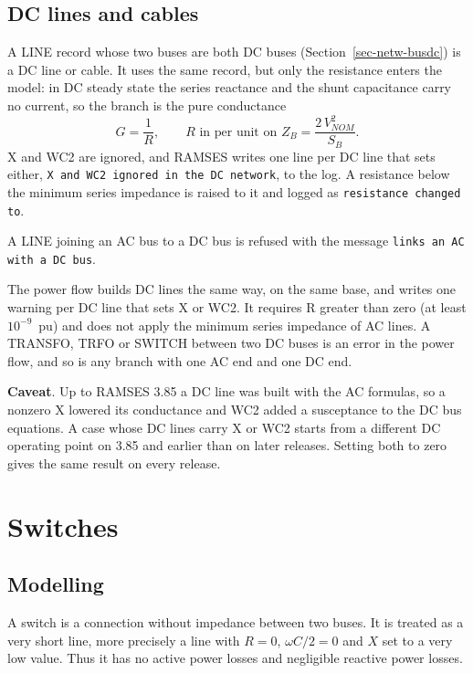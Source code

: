 \subsection{DC lines and cables}\label{sec-netw-dcline}

A LINE record whose two buses are both DC buses (Section~\ref{sec-netw-busdc}) is a DC line or cable. It uses the same record, but only the resistance enters the model: in DC steady state the series reactance and the shunt capacitance carry no current, so the branch is the pure conductance
\[
G = \frac{1}{R}, \qquad R \mbox{ in per unit on } Z_B = \frac{2\,V_{NOM}^2}{S_B}.
\]
X and WC2 are ignored, and RAMSES writes one line per DC line that sets either, {\tt X and WC2 ignored in the DC network}, to the log. A resistance below the minimum series impedance is raised to it and logged as {\tt resistance changed to}.

A LINE joining an AC bus to a DC bus is refused with the message {\tt links an AC with a DC bus}.

The power flow builds DC lines the same way, on the same base, and writes one warning per DC line that sets X or WC2. It requires R greater than zero (at least $10^{-9}$~pu) and does not apply the minimum series impedance of AC lines. A TRANSFO, TRFO or SWITCH between two DC buses is an error in the power flow, and so is any branch with one AC end and one DC end.

{\bf \large Caveat}. Up to RAMSES 3.85 a DC line was built with the AC formulas, so a nonzero X lowered its conductance and WC2 added a susceptance to the DC bus equations. A case whose DC lines carry X or WC2 starts from a different DC operating point on 3.85 and earlier than on later releases. Setting both to zero gives the same result on every release.

\section{Switches}\label{sec-netw-switch}

\subsection{Modelling}

A switch is a connection without impedance between two buses. It is treated as a very short line, more precisely a line with $R=0$, ${\omega}C/2 = 0$ and $X$ set to a very low value. Thus it has no active power losses and negligible reactive power losses.

